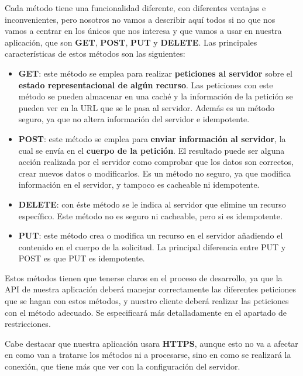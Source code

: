 Cada método tiene una funcionalidad diferente, con diferentes ventajas e inconvenientes, pero nosotros no vamos a describir aquí todos si no que nos vamos a centrar en los únicos que nos interesa y que vamos a usar en nuestra aplicación, que son \textbf{GET}, \textbf{POST}, \textbf{PUT} y \textbf{DELETE}. Las principales características de estos métodos son las siguientes:

\begin{itemize}
	\item \textbf{GET}: este método se emplea para realizar \textbf{peticiones al servidor} sobre el \textbf{estado representacional de algún recurso}. Las peticiones con este método se pueden almacenar en una caché y la información de la petición se pueden ver en la URL que se le pasa al servidor. Además es un método seguro, ya que no altera información del servidor e \gls{idempotente}. \cite{mdn02}
	
	\item \textbf{POST}: este método se emplea para \textbf{enviar información al servidor}, la cual se envía en el \textbf{cuerpo de la petición}. El resultado puede ser alguna acción realizada por el servidor como comprobar que los datos son correctos, crear nuevos datos o modificarlos. Es un método no seguro, ya que modifica información en el servidor, y tampoco es cacheable ni idempotente. \cite{mdn03} 
	
	\item \textbf{DELETE}: con éste método se le indica al servidor que elimine un recurso específico. Este método no es seguro ni cacheable, pero si es idempotente. \cite{mdn04}
	
	\item \textbf{PUT}: este método crea o modifica un recurso en el servidor añadiendo el contenido en el cuerpo de la solicitud. La principal diferencia entre PUT y POST es que PUT es idempotente. \cite{mdn05}
\end{itemize}

Estos métodos tienen que tenerse claros en el proceso de desarrollo, ya que la \gls{API} de nuestra aplicación deberá manejar correctamente las diferentes peticiones que se hagan con estos métodos, y nuestro cliente deberá realizar las peticiones con el método adecuado. Se especificará más detalladamente en el apartado de restricciones. 

Cabe destacar que nuestra aplicación usara \textbf{HTTPS}, aunque esto no va a afectar en como van a tratarse los métodos ni a procesarse, sino en como se realizará la conexión, que tiene más que ver con la configuración del servidor.

